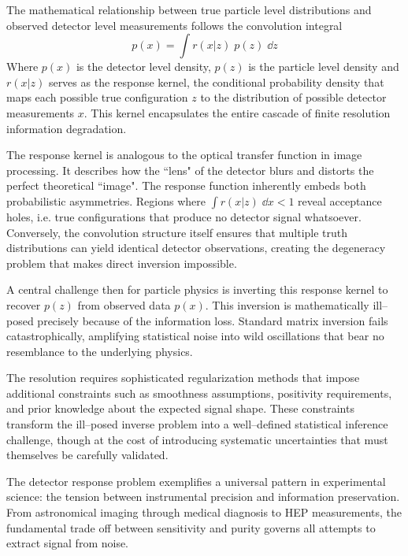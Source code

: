     The mathematical relationship between true particle level distributions and observed detector level measurements follows the convolution integral
    \[
        \label{eq:forward-folding}
        p(x) = \int r(x|z)\;p(z)\; \dd z
    \]
    Where \(p(x)\) is the detector level density, \(p(z)\) is the particle level density and \(r(x|z)\) serves as the response kernel, the conditional probability density that maps each possible true configuration \(z\) to the distribution of possible detector measurements \(x\).
    This kernel encapsulates the entire cascade of finite resolution information degradation.
    
    The response kernel is analogous to the optical transfer function in image processing.
    It describes how the ``lens" of the detector blurs and distorts the perfect theoretical ``image".
    The response function inherently embeds both probabilistic asymmetries.
    Regions where \(\int r(x|z)\;\dd x < 1\) reveal acceptance holes, i.e. true configurations that produce no detector signal whatsoever.
    Conversely, the convolution structure itself ensures that multiple truth distributions can yield identical detector observations, creating the degeneracy problem that makes direct inversion impossible.
    
    A central challenge then for particle physics is inverting this response kernel to recover \(p(z)\) from observed data \(p(x)\).
    This inversion is mathematically ill--posed precisely because of the information loss.
    Standard matrix inversion fails catastrophically, amplifying statistical noise into wild oscillations that bear no resemblance to the underlying physics.
    
    The resolution requires sophisticated regularization methods that impose additional constraints such as smoothness assumptions, positivity requirements, and prior knowledge about the expected signal shape.
    These constraints transform the ill--posed inverse problem into a well--defined statistical inference challenge, though at the cost of introducing systematic uncertainties that must themselves be carefully validated.
    
    The detector response problem exemplifies a universal pattern in experimental science: the tension between instrumental precision and information preservation.
    From astronomical imaging through medical diagnosis to HEP measurements, the fundamental trade off between sensitivity and purity governs all attempts to extract signal from noise.

